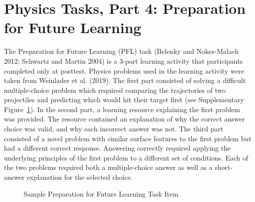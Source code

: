 \documentclass[
  letterpaper,
  DIV=11,
  numbers=noendperiod]{scrreprt}
\begin{document}
\section{Physics Tasks, Part 4: Preparation for Future
Learning}\label{physics-tasks-part-4-preparation-for-future-learning}

The Preparation for Future Learning (PFL) task (Belenky and Nokes-Malach
2012; Schwartz and Martin 2004) is a 3-part learning activity that
participants completed only at posttest. Physics problems used in the
learning activity were taken from Weinlader et al. (2019). The first
part consisted of solving a difficult multiple-choice problem which
required comparing the trajectories of two projectiles and predicting
which would hit their target first (see Supplementary
Figure~\ref{fig-pfl}). In the second part, a learning resource
explaining the first problem was provided. The resource contained an
explanation of why the correct answer choice was valid, and why each
incorrect answer was not. The third part consisted of a novel problem
with similar surface features to the first problem but had a different
correct response. Answering correctly required applying the underlying
principles of the first problem to a different set of conditions. Each
of the two problems required both a multiple-choice answer as well as a
short-answer explanation for the selected choice.

\begin{figure}[!hp]

\caption{\label{fig-pfl}Sample Preparation for Future Learning Task
Item}


\end{figure}%
\end{document}
